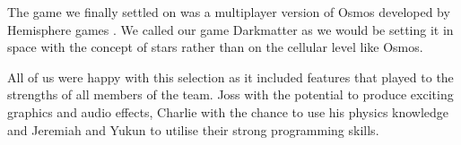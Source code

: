 The game we finally settled on was a multiplayer version of Osmos
developed by Hemisphere games \cite{osmos}. We called our game
Darkmatter as we would be setting it in space with the concept of
stars rather than on the cellular level like Osmos.

All of us were happy with this selection as it included features that
played to the strengths of all members of the team. Joss with the
potential to produce exciting graphics and audio effects, Charlie with
the chance to use his physics knowledge and Jeremiah and Yukun to
utilise their strong programming skills.



